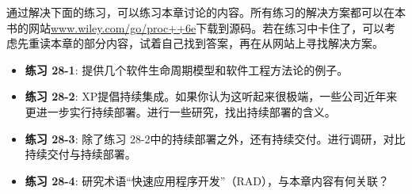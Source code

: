 通过解决下面的练习，可以练习本章讨论的内容。所有练习的解决方案都可以在本书的网站\url{www.wiley.com/go/proc++6e}下载到源码。若在练习中卡住了，可以考虑先重读本章的部分内容，试着自己找到答案，再在从网站上寻找解决方案。

\begin{itemize}
\item
\textbf{练习 28-1}: 提供几个软件生命周期模型和软件工程方法论的例子。

\item
\textbf{练习 28-2}: XP提倡持续集成。如果你认为这听起来很极端，一些公司近年来更进一步实行持续部署。进行一些研究，找出持续部署的含义。

\item
\textbf{练习 28-3}: 除了练习 28-2中的持续部署之外，还有持续交付。进行调研，对比持续交付与持续部署。

\item
\textbf{练习 28-4}: 研究术语“快速应用程序开发”（RAD），与本章内容有何关联？
\end{itemize}










